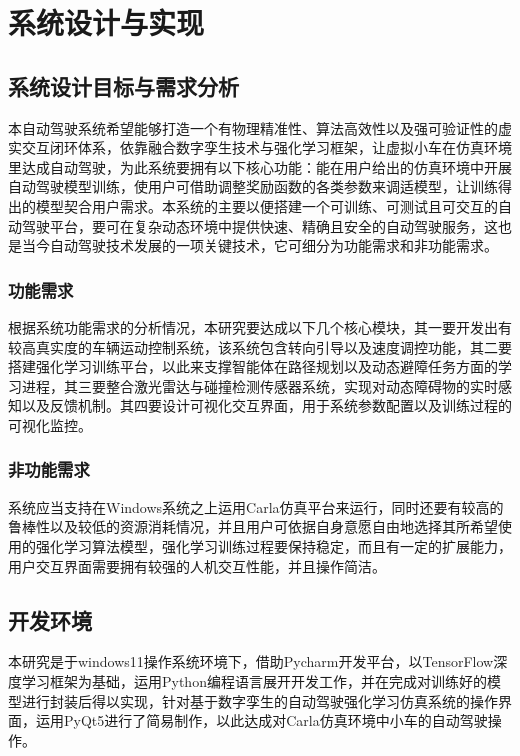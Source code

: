 \chapter{系统设计与实现}

\section{系统设计目标与需求分析}

本自动驾驶系统希望能够打造一个有物理精准性、算法高效性以及强可验证性的虚实交互闭环体系，依靠融合数字孪生技术与强化学习框架，让虚拟小车在仿真环境里达成自动驾驶，为此系统要拥有以下核心功能：能在用户给出的仿真环境中开展自动驾驶模型训练，使用户可借助调整奖励函数的各类参数来调适模型，让训练得出的模型契合用户需求。本系统的主要以便搭建一个可训练、可测试且可交互的自动驾驶平台，要可在复杂动态环境中提供快速、精确且安全的自动驾驶服务，这也是当今自动驾驶技术发展的一项关键技术，它可细分为功能需求和非功能需求。

\subsection{功能需求}

根据系统功能需求的分析情况，本研究要达成以下几个核心模块，其一要开发出有较高真实度的车辆运动控制系统，该系统包含转向引导以及速度调控功能，其二要搭建强化学习训练平台，以此来支撑智能体在路径规划以及动态避障任务方面的学习进程，其三要整合激光雷达与碰撞检测传感器系统，实现对动态障碍物的实时感知以及反馈机制。其四要设计可视化交互界面，用于系统参数配置以及训练过程的可视化监控。

\subsection{非功能需求}

系统应当支持在Windows系统之上运用Carla仿真平台来运行，同时还要有较高的鲁棒性以及较低的资源消耗情况，并且用户可依据自身意愿自由地选择其所希望使用的强化学习算法模型，强化学习训练过程要保持稳定，而且有一定的扩展能力，用户交互界面需要拥有较强的人机交互性能，并且操作简洁。


\section{开发环境}

本研究是于windows11操作系统环境下，借助Pycharm开发平台，以TensorFlow深度学习框架为基础，运用Python编程语言展开开发工作，并在完成对训练好的模型进行封装后得以实现，针对基于数字孪生的自动驾驶强化学习仿真系统的操作界面，运用PyQt5进行了简易制作，以此达成对Carla仿真环境中小车的自动驾驶操作。

